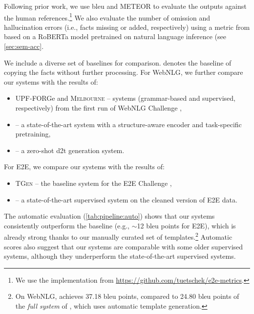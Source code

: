 Following prior work, we use \acs{bleu} \cite{papineni2002bleu} and METEOR \cite{banerjee-lavie-2005-meteor} to evaluate the outputs against the human references.\footnote{We use the implementation from \url{https://github.com/tuetschek/e2e-metrics}.} We also evaluate the number of omission and hallucination errors (i.e., facts missing or added, respectively) using a metric from \citet{dusekEvaluatingSemanticAccuracy2020} based on a RoBERTa model \cite{liuRoBERTaRobustlyOptimized2019} pretrained on natural language inference (see \autoref{sec:sem-acc}.

We include a diverse set of baselines for comparison. \baselinecopy{} denotes the baseline of copying the facts without further processing. For WebNLG, we further compare our systems with the results of:
\begin{itemize}
    \item UPF-FORGe and \textsc{Melbourne} -- systems (grammar-based and supervised, respectively) from the first run of WebNLG Challenge \cite{gardentWebNLGChallengeGenerating2017},
    \item  \citet{keJointGTGraphTextJoint2021} -- a state-of-the-art system with a structure-aware encoder and task-specific pretraining,
    \item \citet{laha2020scalable} -- a zero-shot \ac{d2t} generation system.
\end{itemize}
For E2E, we compare our systems with the results of:
\begin{itemize}
    \item \textsc{TGen} \cite{dusekTrainingNaturalLanguage2015} -- the baseline system for the E2E Challenge \cite{dusekEvaluatingStateoftheartEndtoEnd2020},
    \item \citet{harkousHaveYourText2020} -- a state-of-the-art supervised system on the cleaned version of E2E data.
\end{itemize}

The automatic evaluation (\autoref{tab:pipeline:auto}) shows that our systems consistently outperform the \baselinecopy{} baseline (e.g., $\sim$12 \acs{bleu} points for E2E), which is already strong thanks to our manually curated set of templates.\footnote{On WebNLG, \baselinecopy{} achieves 37.18 \acs{bleu} points, compared to 24.80 \acs{bleu} points of the \textit{full system} of \citet{laha2020scalable}, which uses automatic template generation.} Automatic scores also suggest that our systems are comparable with some older supervised systems, although they underperform the state-of-the-art supervised systems.

